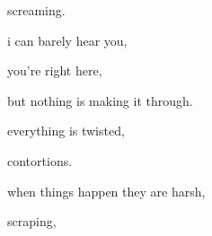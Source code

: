 \documentclass[extrafontsizes, 48pt]{memoir}
\newcommand\blankpage{%
    \null
    \thispagestyle{empty}%
    \addtocounter{page}{-1}%
    \newpage}
\begin{document}
	\begin{minipage}{.6\textwidth}
	screaming.
	\afterpage{\blankpage}
	\end{minipage}
	\newpage

	\begin{minipage}{.6\textwidth}
	i can barely hear you,
	\end{minipage}
	\newpage

	\begin{minipage}{.6\textwidth}
	you're right here,
	\end{minipage}
	\newpage

	\begin{minipage}{.6\textwidth}
	but nothing is making it through.
	\afterpage{\blankpage}
	\end{minipage}
	\newpage

	\begin{minipage}{.6\textwidth}
	everything is twisted,
	\end{minipage}
	\newpage

	\begin{minipage}{.6\textwidth}
	contortions.
	\end{minipage}
	\newpage

	\begin{minipage}{.6\textwidth}
	when things happen they are harsh,
	\end{minipage}
	\newpage

	\begin{minipage}{.6\textwidth}
	scraping,
	\end{minipage}
	\newpage
\end{document}
